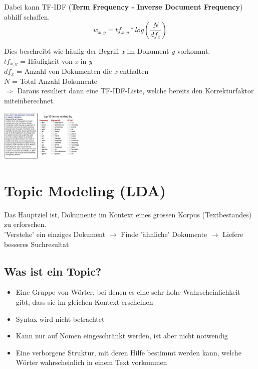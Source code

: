 \documentclass{article}
\newenvironment{Figure}
	{\par\medskip\noindent\minipage{\linewidth}}
	{\endminipage\par\medskip}
\theoremstyle{merke}
\theoremstyle{definition}
\begin{document}
    Dabei kann TF-IDF (\textbf{Term Frequency - Inverse Document Frequency}) abhilf schaffen.
    \begin{equation}
        w_{x , y} = tf_{x , y} * log(\frac{N}{df_x})
    \end{equation}

    Dies beschreibt wie häufig der Begriff \textit{x} im Dokument \textit{y} vorkommt.\\
    $tf_{x , y}$ = Häufigkeit von \textit{x} in \textit{y}\\
    $df_x$ = Anzahl von Dokumenten die \textit{x} enthalten\\
    $N$ = Total Anzahl Dokumente\\
    $\Rightarrow$ Daraus resuliert dann eine TF-IDF-Liste, welche bereits den Korrekturfaktor miteinberechnet.
    \begin{Figure}
    \centering
    \includegraphics[width=150px]{img/tfidfexample.png}
        \label{fig:Beispiel einer TF-IDF-Liste}
    \end{Figure}

    \section{Topic Modeling (LDA)}
    Das Hauptziel ist, Dokumente im Kontext eines grossen Korpus (Textbestandes) zu erforschen.\\
    'Verstehe' ein einziges Dokument $\rightarrow$ Finde 'ähnliche' Dokumente $\rightarrow$ Liefere besseres Suchresultat

	    \subsection{Was ist ein Topic?}
        \begin{itemize}
            \item Eine Gruppe von Wörter, bei denen es eine sehr hohe Wahrscheinlichkeit gibt, dass sie im gleichen Kontext erscheinen
            \item Syntax wird nicht betrachtet
            \item Kann nur auf Nomen eingeschränkt werden, ist aber nicht notwendig
            \item Eine verborgene Struktur, mit deren Hilfe bestimmt werden kann, welche Wörter wahrscheinlich in einem Text vorkommen
        \end{itemize}
\end{document}
